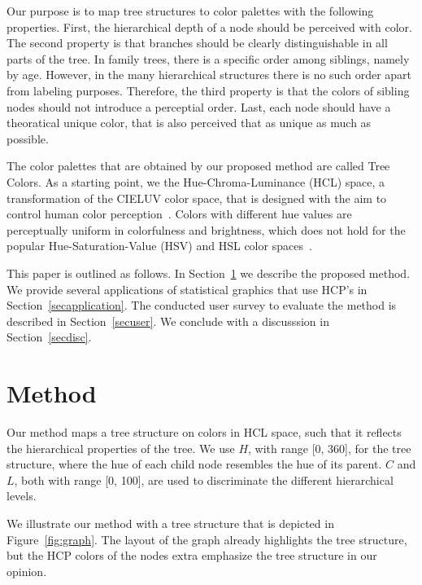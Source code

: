 \documentclass[journal]{vgtc}                %
\begin{document}
Our purpose is to map tree structures to color palettes with the following properties. First, the hierarchical depth of a node should be perceived with color. The second property is that branches should be clearly distinguishable in all parts of the tree. In family trees, there is a specific order among siblings, namely by age. However, in the many hierarchical structures there is no such order apart from labeling purposes. Therefore, the third property is that the colors of sibling nodes should not introduce a perceptial order. Last, each node should have a theoratical unique color, that is also perceived that as unique as much as possible.

The color palettes that are obtained by our proposed method are called Tree Colors. As a starting point, we the Hue-Chroma-Luminance (HCL) space, a transformation of the CIELUV color space, that is designed with the aim to control human color perception~\cite{ihaka2003}. Colors with different hue values are perceptually uniform in colorfulness and brightness, which does not hold for the popular Hue-Saturation-Value (HSV) and HSL color spaces~\cite{zeileis2009}.

This paper is outlined as follows. In Section~\ref{secmethod} we describe the proposed method. We provide several applications of statistical graphics that use HCP's in Section~\ref{secapplication}. The conducted user survey to evaluate the method is described in Section~\ref{secuser}. We conclude with a discusssion in Section~\ref{secdisc}.

\section{Method}\label{secmethod}
Our method maps a tree structure on colors in HCL space, such that it reflects the hierarchical properties of the tree. We use $H$, with range [0, 360], for the tree structure, where the hue of each child node resembles the hue of its parent. $C$ and $L$, both with range [0, 100], are used to discriminate the different hierarchical levels.

We illustrate our method with a tree structure that is depicted in Figure~\ref{fig:graph}. The layout of the graph already highlights the tree structure, but the HCP colors of the nodes extra emphasize the tree structure in our opinion.
\end{document}
